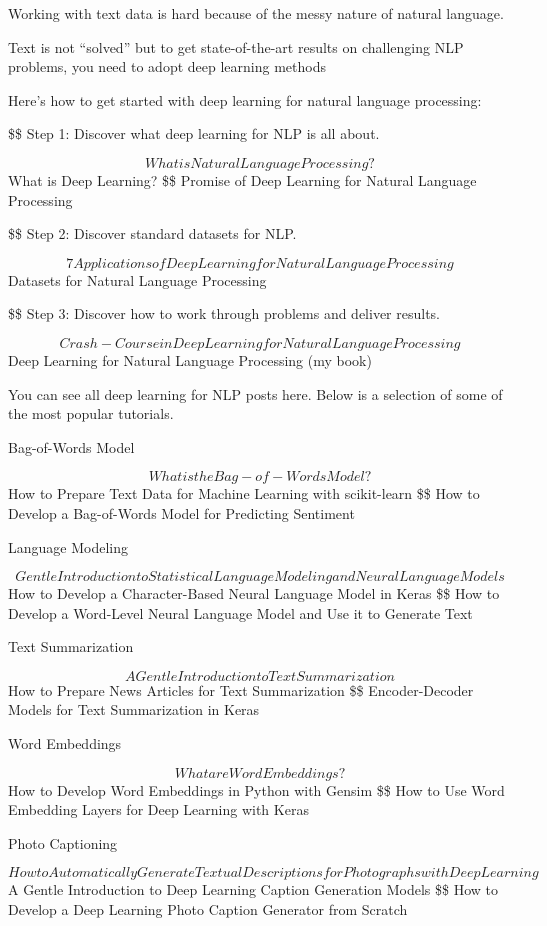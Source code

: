 \documentclass[11pt]{article}
\begin{document}
Working with text data is hard because of the messy nature of natural language.

Text is not “solved” but to get state-of-the-art results on challenging NLP problems, you need to adopt deep learning methods

Here’s how to get started with deep learning for natural language processing:

\$\$ Step 1: Discover what deep learning for NLP is all about. 

$$ What is Natural Language Processing?
 $$ What is Deep Learning?
\$\$ Promise of Deep Learning for Natural Language Processing

\$\$ Step 2: Discover standard datasets for NLP. 

$$ 7 Applications of Deep Learning for Natural Language Processing
 $$ Datasets for Natural Language Processing

\$\$ Step 3: Discover how to work through problems and deliver results. 

$$ Crash-Course in Deep Learning for Natural Language Processing
 $$ Deep Learning for Natural Language Processing (my book)

You can see all deep learning for NLP posts here. Below is a selection of some of the most popular tutorials.

Bag-of-Words Model

$$ What is the Bag-of-Words Model?
$$ How to Prepare Text Data for Machine Learning with scikit-learn
\$\$ How to Develop a Bag-of-Words Model for Predicting Sentiment

Language Modeling

$$ Gentle Introduction to Statistical Language Modeling and Neural Language Models
$$ How to Develop a Character-Based Neural Language Model in Keras
\$\$ How to Develop a Word-Level Neural Language Model and Use it to Generate Text

Text Summarization

$$ A Gentle Introduction to Text Summarization
$$ How to Prepare News Articles for Text Summarization
\$\$ Encoder-Decoder Models for Text Summarization in Keras

Word Embeddings

$$ What are Word Embeddings?
$$ How to Develop Word Embeddings in Python with Gensim
\$\$ How to Use Word Embedding Layers for Deep Learning with Keras

Photo Captioning

$$ How to Automatically Generate Textual Descriptions for Photographs with Deep Learning
$$ A Gentle Introduction to Deep Learning Caption Generation Models
\$\$ How to Develop a Deep Learning Photo Caption Generator from Scratch
\end{document}
